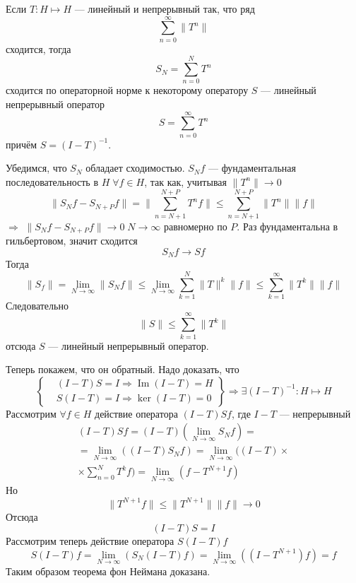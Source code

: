 \documentclass[12pt]{article}
\renewcommand{\Im}{\operatorname{Im}}
\begin{document}
\begin{Theor}
    Если $T : H \mapsto H$ --- линейный и непрерывный так, что ряд 
    $$
    \sum_{n = 0}^\infty \|T^n\|
    $$
    сходится, тогда
    $$
    S_N = \sum_{n = 0}^N T^n
    $$
    сходится по операторной норме
    к некоторому оператору $S$ --- линейный непрерывный оператор
    $$
    S = \sum_{n = 0}^\infty T^n
    $$
    причём $S = (I - T)^{-1}$.
\end{Theor}
\begin{Proof}
    Убедимся, что $S_N$ обладает сходимостью.
    $S_N f$ --- фундаментальная последовательность в $H\; \forall f \in H$, так как,
    учитывая $\|T^n\| \to 0$ 
    $$
    \|S_N f - S_{N+P} f\| = \|\sum_{n = N + 1}^{N + P} T^n f\|
    \le \sum_{n = N + 1}^{N + P}\|T^n\|\|f\| 
    $$
    $\Rightarrow$ $\|S_N f - S_{N+P} f\| \to 0\; N \to \infty$ равномерно по $P$.
    Раз фундаментальна в гильбертовом, значит сходится 
    $$
    S_N f \to Sf
    $$
    Тогда 
    $$
    \|S_f\| = \lim \limits_{N \to \infty}\|S_N f\| \le \lim \limits_{N \to \infty} \sum_{k = 1}^N \|T\|^k\|f\| \le \sum_{k = 1}^{\infty} \|T^k\| \|f\|
    $$
    Следовательно 
    $$
    \|S\| \le \sum \limits_{k = 1}^{\infty}\|T^k\|
    $$ 
    отсюда $S$ --- линейный непрерывный оператор.

    Теперь покажем, что он обратный.
    Надо доказать, что 
    $$
    \left\{
        \begin{aligned}
            &(I - T)S = I \Rightarrow \Im(I - T) = H\\
            &S(I - T) = I \Rightarrow \ker(I - T) = 0
        \end{aligned}
    \right\} \Rightarrow \exists (I - T)^{-1} : H \mapsto H
    $$
    Рассмотрим $\forall f \in H$ действие оператора $(I - T)Sf$, где $I - T$ --- непрерывный
    \begin{multline*}
    (I - T)Sf = (I - T)(\lim \limits_{N \to \infty} S_N f) = \\
    = \lim \limits_{N \to \infty}((I - T)S_N f) 
    = \lim \limits_{N \to \infty}((I - T) \times \\
    \times \sum\limits_{n = 0}^N T^k f) = \lim \limits_{N \to \infty}(f - T^{N+1}f)
    \end{multline*}
    Но
    $$
    \|T^{N+1}f\| \le \|T^{N+1}\|\|f\| \to 0
    $$
    Отсюда 
    $$
    (I - T)S = I
    $$
    Рассмотрим теперь действие оператора $S(I - T)f$
    $$
    S(I - T)f = \lim \limits_{N \to \infty}(S_N(I - T)f) = \lim \limits_{N \to \infty}((I - T^{N+1})f) = f
    $$
    Таким образом теорема фон Неймана доказана.
\end{Proof}
\end{document}
